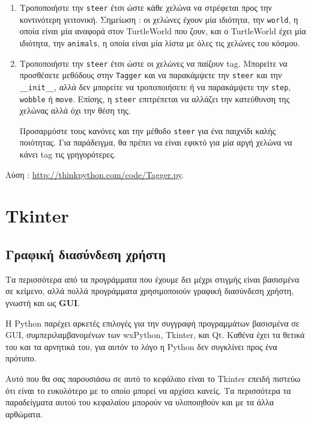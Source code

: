 \documentclass[10pt]{book}
\begin{document}
\begin{exercise}
\begin{enumerate}
\item Τροποποιήστε την  {\tt steer}  έτσι ώστε κάθε χελώνα να στρέφεται προς την 
  κοντινότερη γειτονική.  Σημείωση :  οι χελώνες έχουν μία ιδιότητα, την  
  {\tt world},  η οποία είναι μία αναφορά στον  TurtleWorld  που ζουν, και ο 
   TurtleWorld  έχει μία ιδιότητα, την  {\tt animals},  η οποία είναι μία λίστα 
  με όλες τις χελώνες του κόσμου.

\item Τροποποιήστε την  {\tt steer}  έτσι ώστε οι χελώνες να παίζουν  tag.   
  Μπορείτε να προσθέσετε μεθόδους στην  {\tt Tagger}  και να παρακάμψετε την  
  {\tt steer}  και την  \verb"__init__",  αλλά δεν μπορείτε να τροποποιήσετε ή 
  να παρακάμψετε την  {\tt step}, {\tt wobble}  ή  {\tt move}.   Επίσης, η  
  {\tt steer}  επιτρέπεται να αλλάζει την κατεύθυνση της χελώνας αλλά όχι την θέση της.

Προσαρμόστε τους κανόνες και την μέθοδο  {\tt steer}  για ένα παιχνίδι καλής 
ποιότητας.  Για παράδειγμα, θα πρέπει να είναι εφικτό για μία αργή χελώνα να κάνει  tag 
 τις γρηγορότερες.

\end{enumerate}

Λύση : \url{http://thinkpython.com/code/Tagger.py}.

\end{exercise}



\chapter{Tkinter}
\label{tkinter}

 
\section{Γραφική διασύνδεση χρήστη}

Τα περισσότερα από τα προγράμματα που έχουμε δει μέχρι στιγμής είναι βασισμένα σε κείμενο, 
αλλά πολλά προγράμματα χρησιμοποιούν γραφική διασύνδεση χρήστη, γνωστή και ως  {\bf GUI}.

 Η  Python  παρέχει αρκετές επιλογές για την συγγραφή προγραμμάτων βασισμένα σε 
 GUI,  συμπεριλαμβανομένων των  wxPython, Tkinter,  και  Qt.   Καθένα 
έχει τα θετικά του και τα αρνητικά του, για αυτόν το λόγο η  Python  δεν συγκλίνει προς ένα πρότυπο.

Αυτό που θα σας παρουσιάσω σε αυτό το κεφάλαιο είναι το  Tkinter  επειδή πιστεύω 
ότι είναι το ευκολότερο με το οποίο μπορεί να αρχίσει κανείς.  Τα περισσότερα τα παραδείγματα αυτού του κεφαλαίου μπορούν να υλοποιηθούν και με τα άλλα αρθώματα.
\end{document}
